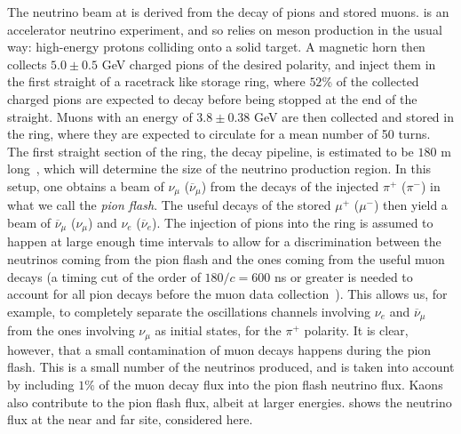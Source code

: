 The neutrino beam at \nus is derived from the decay of pions and stored muons. \nus is an accelerator neutrino experiment, and so relies on meson production in the usual way: high-energy protons colliding onto a solid target. A magnetic horn then collects $5.0 \pm 0.5$ GeV charged pions of the desired polarity, and inject them in the first straight of a racetrack like storage ring, where $52$\% of the collected charged pions are expected to decay before being stopped at the end of the straight. Muons with an energy of $3.8 \pm 0.38$ GeV are then collected and stored in the ring, where they are expected to circulate for a mean number of 50 turns. The first straight section of the ring, the decay pipeline, is estimated to be $180$ m long~\cite{Neuffer2015}, which will determine the size of the neutrino production region. 
In this setup, one obtains a beam of  $\nu_{\mu}$ ($\overline{\nu}_{\mu}$) from the decays of the injected $\pi^+$ ($\pi^-$) in what we call the \emph{pion flash}. The useful decays of the stored $\mu^+$ ($\mu^-$) then yield a beam of $\overline{\nu}_{\mu}$ ($\nu_{\mu}$) and $\nu_e$ ($\overline{\nu}_{e}$). The injection of pions into the ring is assumed to happen at large enough time intervals to allow for a discrimination between the neutrinos coming from the pion flash and the ones coming from the useful muon decays (a timing cut of the order of $180/c = 600$ ns or greater is needed to account for all pion decays before the muon data collection~\cite{Tunnell2013}). This allows us, for example, to completely separate the oscillations channels involving $\nu_{e}$ and $\overline{\nu}_{\mu}$ from the ones involving $\nu_{\mu}$ as initial states, for the $\pi^+$ polarity. It is clear, however, that a small contamination of muon decays happens during the pion flash. This is a small number of the neutrinos produced, and is taken into account by including $1\%$ of the muon decay flux into the pion flash neutrino flux. Kaons also contribute to the pion flash flux, albeit at larger energies.  shows the neutrino flux at the near and far site, considered here.
%
